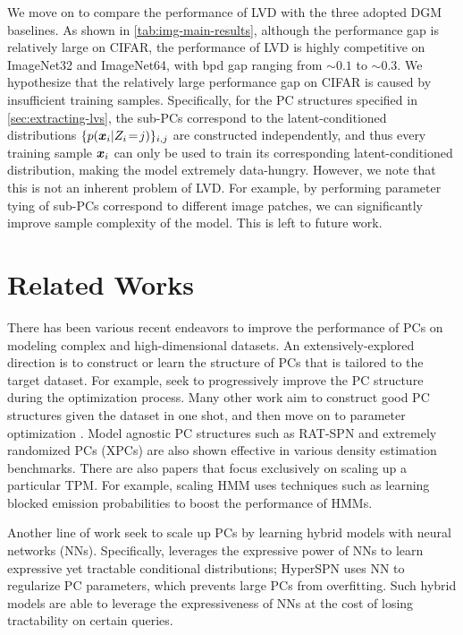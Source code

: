\documentclass{article} %
\begin{document}
We move on to compare the performance of LVD with the three adopted DGM baselines. As shown in \cref{tab:img-main-results}, although the performance gap is relatively large on CIFAR, the performance of LVD is highly competitive on ImageNet32 and ImageNet64, with bpd gap ranging from $\sim\!0.1$ to $\sim\!0.3$. We hypothesize that the relatively large performance gap on CIFAR is caused by insufficient training samples. Specifically, for the PC structures specified in \cref{sec:extracting-lvs}, the sub-PCs correspond to the latent-conditioned distributions $\{{p}(\boldsymbol{x}_i \vert Z_i \!=\! j)\}_{i,j}$ are constructed independently, and thus every training sample $\boldsymbol{x}_i$ can only be used to train its corresponding latent-conditioned distribution, making the model extremely data-hungry. However, we note that this is not an inherent problem of LVD. For example, by performing parameter tying of sub-PCs correspond to different image patches, we can significantly improve sample complexity of the model. This is left to future work.

\vspace{-0.4em}
\section{Related Works}
\vspace{-0.4em}

There has been various recent endeavors to improve the performance of PCs on modeling complex and high-dimensional datasets. An extensively-explored direction is to construct or learn the structure of PCs that is tailored to the target dataset. For example, \citet{gens2013learning,dang2022sparse} seek to progressively improve the PC structure during the optimization process. Many other work aim to construct good PC structures given the dataset in one shot, and then move on to parameter optimization \citep{rahman2014cutset,adel2015learning}. Model agnostic PC structures such as RAT-SPN \citep{peharz2020random} and extremely randomized PCs (XPCs) \citep{di2021random} are also shown effective in various density estimation benchmarks. There are also papers that focus exclusively on scaling up a particular TPM. For example, scaling HMM \citep{chiu-rush-2020-scaling} uses techniques such as learning blocked emission probabilities to boost the performance of HMMs.

Another line of work seek to scale up PCs by learning hybrid models with neural networks (NNs). Specifically, \citet{shao2022conditional} leverages the expressive power of NNs to learn expressive yet tractable conditional distributions; HyperSPN \citep{shih2021hyperspns} uses NN to regularize PC parameters, which prevents large PCs from overfitting. Such hybrid models are able to leverage the expressiveness of NNs at the cost of losing tractability on certain queries.
\end{document}
